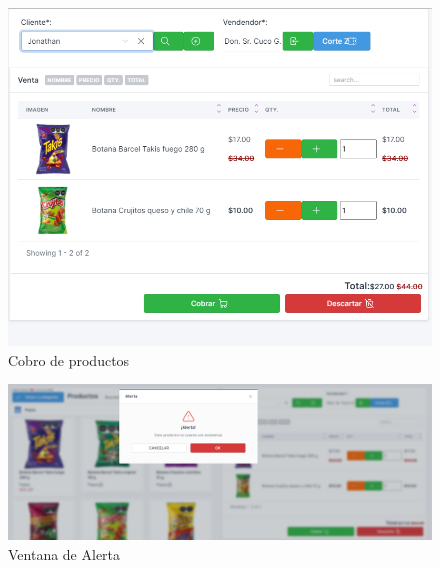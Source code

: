 \documentclass[a4paper,DIV=12]{scrreprt}
\begin{document}
	
	\begin{figure}[!htb]
		\centering
		\includegraphics[scale=0.4]{VENTAS3.PNG}
		\caption{Cobro de productos}
	\end{figure}	
	
	\begin{figure}[!htb]
		\centering
		\includegraphics[scale=0.4]{VENTAS4.PNG}
		\caption{Ventana de Alerta}
	\end{figure}
	
\end{document}
